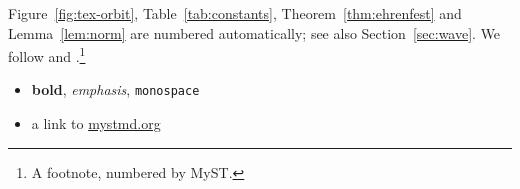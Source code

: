 \documentclass{article}
\begin{document}
Figure~\ref{fig:tex-orbit}, Table~\ref{tab:constants}, Theorem~\ref{thm:ehrenfest} and
Lemma~\ref{lem:norm} are numbered automatically; see also Section~\ref{sec:wave}.
We follow \cite{nielsen2010} and \citet{schrodinger1926}.\footnote{A footnote, numbered by MyST.}

\begin{itemize}
  \item \textbf{bold}, \emph{emphasis}, \texttt{monospace}
  \item a link to \href{https://mystmd.org}{mystmd.org}
\end{itemize}
\end{document}
